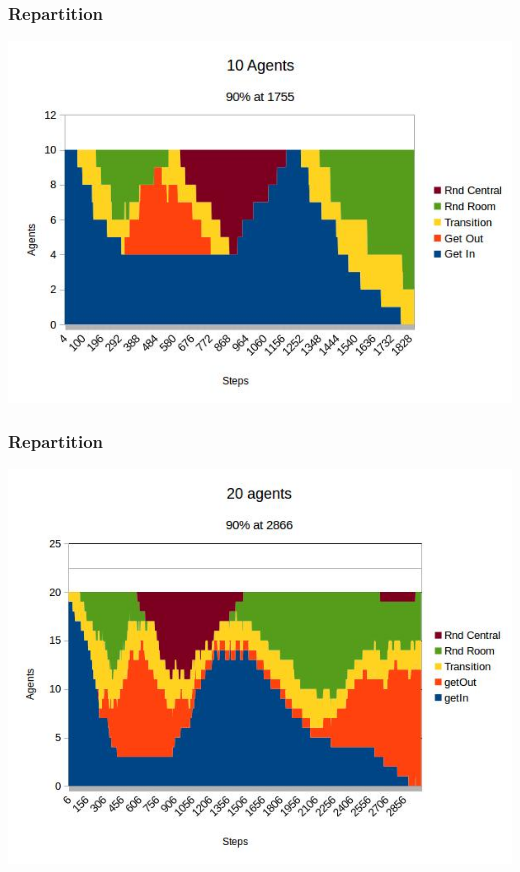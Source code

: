 \documentclass[xcolor={x11names, rgb, usenames, dvipsnames}]{beamer}
\begin{document}
\begin{frame}
\frametitle{Repartition}
\includegraphics[height=\textheight]{agents_10}
\end{frame}

\begin{frame}
\frametitle{Repartition}
\includegraphics[height=\textheight]{agents_20}
\end{frame}
\end{document}
